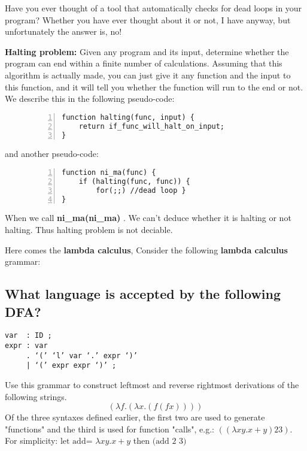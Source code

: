 \documentclass[a4paper]{article}
\theoremstyle{definition}
\begin{document}
Have you ever thought of a tool that automatically checks for dead loops in your program? Whether you have ever thought about it or not, I have anyway, but unfortunately the answer is, no!

\textbf{Halting problem:} Given any program and its input, determine whether the program can end within a finite number of calculations. Assuming that this algorithm is actually made, you can just give it any function and the input to this function, and it will tell you whether the function will run to the end or not.
We describe this in the following pseudo-code:


\begin{figure}[H]
    \begin{lstlisting}[language={[ANSI]C},
            numbers=left,
            numberstyle=\extratiny,
            basicstyle=\small]
function halting(func, input) {
    return if_func_will_halt_on_input;
}
    \end{lstlisting}
\end{figure}

and another pseudo-code:
\begin{figure}[H]
    \begin{lstlisting}[language={[ANSI]C},
            numbers=left,
            numberstyle=\extratiny,
            basicstyle=\small]
function ni_ma(func) {
    if (halting(func, func)) {
        for(;;) //dead loop }
}
    \end{lstlisting}
\end{figure}

When we call \textbf { ni\_ma(ni\_ma) }. We can't deduce whether it is halting or not halting. Thus halting problem is not deciable.


Here comes the \textbf{lambda calculus}, Consider the following \textbf{lambda calculus} grammar:
\subsection{What language is accepted by the following DFA?}
\begin{verbatim}
var  : ID ;
expr : var
     . ‘(’ ‘l’ var ‘.’ expr ‘)’
     | ‘(’ expr expr ‘)’ ;
\end{verbatim}

Use this grammar to construct leftmost and reverse rightmost derivations of the following strings.
$$
(\lambda f .(\lambda x .(f(f x))))
$$
Of the three syntaxes defined earlier, the first two are used to generate "functions" and the third is used for function "calls", e.g.: $ ((\lambda xy.x+y)23) $. For simplicity: $\text {let add= }\lambda{ xy.x+y}$ then $\text{(add 2 3)}$\\
\end{document}
